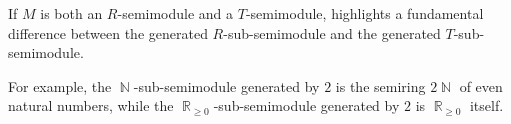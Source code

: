 \begin{remark}\label{rem:span_over_different_semirings}
  If \( M \) is both an \( R \)-semimodule and a \( T \)-semimodule,  highlights a fundamental difference between the generated \( R \)-sub-semimodule and the generated \( T \)-sub-semimodule.

  For example, the \( \BbbN \)-sub-semimodule generated by \( 2 \) is the semiring \( 2\BbbN \) of even natural numbers, while the \( \BbbR_{\geq 0} \)-sub-semimodule generated by \( 2 \) is \( \BbbR_{\geq 0} \) itself.
\end{remark}
